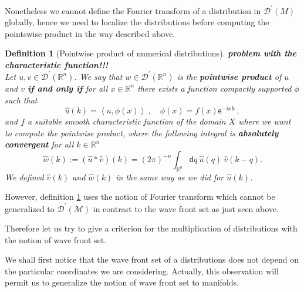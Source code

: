 \documentclass[11pt]{book}
\newcommand{\com}[1]{{\color{red}\bf #1}}
\newcommand{\hilight}[1]{\colorbox{yellow!80!black}{#1}}
\newcommand{\sm}[1]{\left\langle#1\right\rangle}
\newcommand{\Dcal}{\mathcal{D}}
\newcommand{\Mcal}{\mathcal{M}}
\newcommand{\Rbb}{\mathbb{R}}
\newcommand{\dsf}{\mathsf{d}}
\newcommand{\esf}{\mathsf{e}}
\theoremstyle{break}
\newtheorem{definition}{Definition}[chapter]
\begin{document}
Nonetheless we cannot define the Fourier transform of a distribution in $\Dcal^\prime(M)$ globally, hence we need to localize the distributions before computing the pointswise product in the way described above. 



\begin{definition}[Pointwise product of numerical distributions]\label{def:prod_distib_fourier} 
\hilight{\com{problem with the characteristic function!!!}}\\
Let $u, v \in \Dcal^\prime(\Rbb^n)$. We say that $w\in\Dcal^\prime(\Rbb^n)$ is the \textbf{pointwise product} of $u$ and $v$ \textbf{if and only if} for all $x \in \Rbb^n$ there exists a function compactly supported $\phi$ such that
%
\begin{equation*}
\widehat{u}(k) = \sm{u , \phi(x)} \ , \quad \phi(x) = f(x) \esf^{-ixk} \ ,
\end{equation*}
%
and $f$ a suitable smooth characteristic function of the domain $X$ where we want to compute the pointwise product, where the following integral is \textbf{absolutely convergent} for all $k\in\Rbb^n$
%
\begin{equation*}
\widehat{w}(k) := \left(\widehat{u} \ast \widehat{v}\right)(k) = (2\pi)^{-n} \int_{\Rbb^n} \dsf q \ \widehat{u}(q) \ \widehat{v}(k-q) .
\end{equation*}
%
We defined $\widehat{v}(k)$ and $\widehat{w}(k)$ in the same way as we did for $\widehat{u}(k)$.
\end{definition}


However, definition \ref{def:prod_distib_fourier} uses the notion of Fourier transform which cannot be generalized to $\Dcal^\prime(\Mcal)$ in contrast to the wave front set as just seen above.


\bigskip


Therefore let us try to give a criterion for the multiplication of distributions with the notion of wave front set.


We shall first notice that the wave front set of a distributions does not depend on the particular coordinates we are considering. Actually, this observation will permit us to generalize the notion of wave front set to manifolds.
\end{document}
